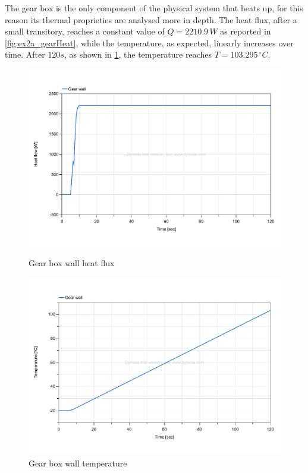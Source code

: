 \documentclass[11pt,a4paper,oneside]{article}
\begin{document}
The gear box is the only component of the physical system that heats up, for this reason its thermal proprieties are analysed more in depth.   
The heat flux, after a small transitory, reaches a constant value of $Q=2210.9\,W$ as reported in \cref{fig:ex2a_gearHeat}, while the temperature, as expected, linearly increases over time.
After $120s$, as shown in \cref{fig:ex2a_gearTemp}, the temperature reaches $T=103.295\,^{\circ}C$.
\begin{figure}[H]
    \centering
    \begin{minipage}{0.45\textwidth}
        \centering
        \includegraphics*[width=\textwidth, keepaspectratio]{Figures/ex2a_gearHeat.pdf}
        \caption[]{\label{fig:ex2a_gearHeat} Gear box wall heat flux}
    \end{minipage}
    \hspace{0.05\textwidth}
    \begin{minipage}{0.45\textwidth}
        \centering
        \includegraphics*[width=\textwidth, keepaspectratio]{Figures/ex2a_gearTemp.pdf}
        \caption[]{\label{fig:ex2a_gearTemp} Gear box wall temperature}
    \end{minipage}
\end{figure}
\end{document}
